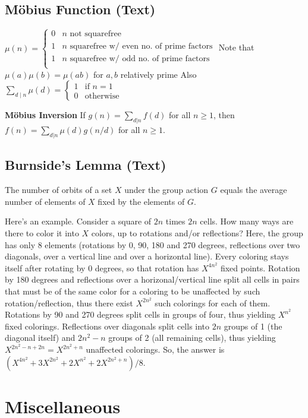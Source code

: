 \documentclass[9pt]{extarticle}
\begin{document}
\begin{multicols*}{3}
\subsection{M\"obius Function (Text)} %
$\mu(n) = \begin{cases}
0 & \text{$n$ not squarefree} \\
1 & \text{$n$ squarefree w/ even no. of prime factors} \\
1 & \text{$n$ squarefree w/ odd no. of prime factors} \\
\end{cases}$
Note that $\mu(a) \mu(b) = \mu(ab)$ for $a, b$ relatively prime
Also $\sum_{d \mid n} \mu(d) = \begin{cases} 1 & \text{if $n = 1$} \\
0 & \text{otherwise} \end{cases}$

\textbf{M\"obius Inversion}
If $g(n) = \sum_{d|n} f(d)$ for all $n \ge 1$, then
$f(n) = \sum_{d|n} \mu(d)g(n/d)$ for all $n \ge 1$.

\subsection{Burnside's Lemma (Text)} %
The number of orbits of a set $X$ under the group action $G$ equals the average
number of elements of $X$ fixed by the elements of $G$.

Here's an example. Consider a square of $2n$ times $2n$ cells. How many ways
are there to color it into $X$ colors, up to rotations and/or reflections?
Here, the group has only 8 elements (rotations by 0, 90, 180 and 270 degrees,
reflections over two diagonals, over a vertical line and over a horizontal
line). Every coloring stays itself after rotating by 0 degrees, so that
rotation has $X^{4n^2}$ fixed points. Rotation by 180 degrees and reflections
over a horizonal/vertical line split all cells in pairs that must be of the
same color for a coloring to be unaffected by such rotation/reflection, thus
there exist $X^{2n^2}$ such colorings for each of them. Rotations by 90 and 270
degrees split cells in groups of four, thus yielding $X^{n^2}$ fixed colorings.
Reflections over diagonals split cells into $2n$ groups of 1 (the diagonal
itself) and $2n^2-n$ groups of 2 (all remaining cells), thus yielding
$X^{2n^2-n+2n}=X^{2n^2+n}$ unaffected colorings.  So, the answer is
$(X^{4n^2}+3X^{2n^2}+2X^{n^2}+2X^{2n^2+n})/8$.

\section{Miscellaneous}


\end{multicols*}
\end{document}
